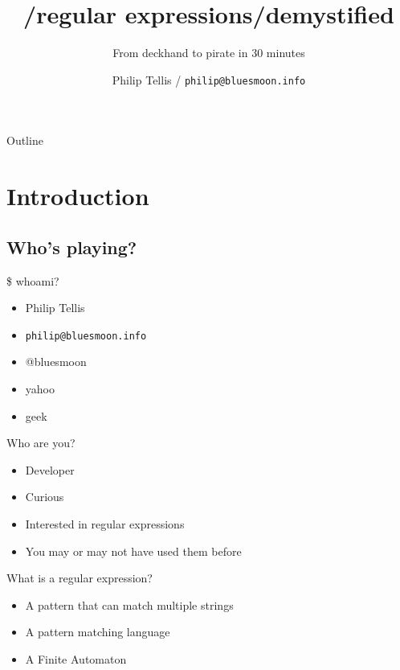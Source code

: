 \documentclass{beamer}
\title{/regular expressions/demystified}
\subtitle{From deckhand to pirate in 30 minutes}
\author{Philip Tellis / \texttt{philip@bluesmoon.info}}
\institute{Yahoo!}
\date{}
\begin{document}
\begin{frame}
  \titlepage
\end{frame}

\begin{frame}{Outline}
  \tableofcontents
\end{frame}


\section{Introduction}

\subsection{Who's playing?}

\begin{frame}{\$ whoami?}
  \begin{itemize}
  \item Philip Tellis
  \item \small{\texttt{philip@bluesmoon.info}}
  \item @bluesmoon
  \item yahoo
  \item geek
  \end{itemize}
\end{frame}

\begin{frame}{Who are you?}
  \begin{itemize}
  \item Developer
  \item Curious
  \item Interested in regular expressions
  \item You may or may not have used them before
  \end{itemize}
\end{frame}

\begin{frame}{What is a regular expression?}
  \begin{itemize}
  \item A pattern that can match multiple strings
  \item A pattern matching language
  \item A Finite Automaton
  \end{itemize}
\end{frame}
\end{document}
